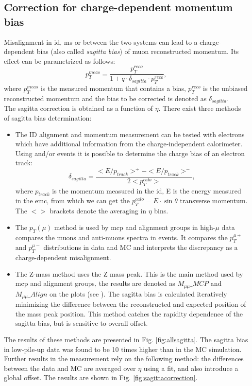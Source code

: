 	\subsection{Correction for charge-dependent momentum bias}
    Misalignment in \gls{id}, \gls{ms} or between the two systems can lead to a charge-dependent bias (also called \textit{sagitta bias}) of muon reconstructed momentum. Its effect can be parametrized as follows:
    \begin{equation}
    	p_T^{meas}=\frac{p_T^{reco}}{1+q\cdot \delta_{sagitta}\cdot p_T^{reco}},
    \end{equation}
    where $p_T^{meas}$ is the measured momentum that contains a bias, $p_T^{reco}$ is the unbiased reconstructed momentum and the bias to be corrected is denoted as $\delta_{sagitta}$.\\
    The sagitta correction is obtained as a function of $\eta$. There exist three methods of sagitta bias determination:
    \begin{itemize}
    	\item The ID alignment and momentum measurement can be tested with electrons which have additional information from the charge-independent calorimeter. Using \Zee and/or \Wenu events it is possible to determine the charge bias of an electron track:
    	\begin{equation}
    		\delta_{sagitta}=\frac{<E/p_{track}>^+-<E/p_{track}>^-}{2<p^{calo}_T>},
    	\end{equation}
    	where $p_{track}$ is the momentum measured in the \gls{id}, E is the energy measured in the \gls{emc}, from which we can get the $p^{calo}_T=E\cdot \sin{\theta}$ transverse momentum. The $<>$ brackets denote the averaging in $\eta$ bins. 
    	\item The $p_T(\mu)$ method is used by \gls{mcp} and alignment groups in high-$\mu$ data compares the muons and anti-muons spectra in \Zmm events. It compares the $p_T^{\mu+}$ and $p_T^{\mu-}$ distributions in data and MC and interprets the discrepancy as a charge-dependent misalignment.
    	\item The Z-mass method uses the Z mass peak. This is the main method used by \gls{mcp} and alignment groups, the results are denoted as $M_{\mu\mu}\_MCP$ and $M_{\mu\mu}\_Align$ on the plots (see \cite{muon_align}). The sagitta bias is calculated iteratively minimizing the difference between the reconstructed and expected position of the \Zmm mass peak position. This method catches the rapidity dependence of the sagitta bias, but is sensitive to overall offset.
    \end{itemize}
	The results of these methods are presented in Fig. \ref{fig:allsagitta}. The sagitta bias in low-pile-up data was found to be 10 times higher than in the MC simulation. Further results in the measurement rely on the following method: the differences between the data and MC are averaged over $\eta$ using a fit, and also introduce a global offset. The results are shown in Fig. \ref{fig:sagittacorrection}.
	
